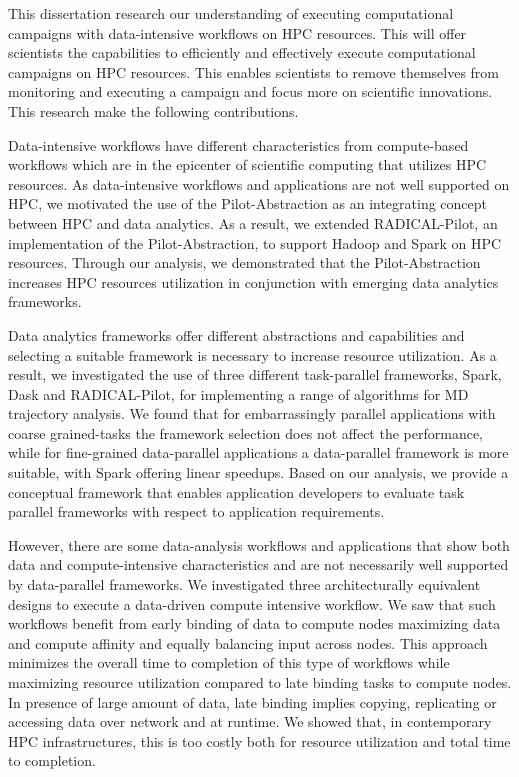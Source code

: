 \label{ch:conclusions}
This dissertation research our understanding of executing computational campaigns with data-intensive workflows on HPC resources.
This will offer scientists the capabilities to efficiently and effectively execute computational campaigns on HPC resources.
This enables scientists to remove themselves from monitoring and executing a campaign and focus more on scientific innovations.
This research make the following contributions.

Data-intensive workflows have different characteristics from compute-based workflows which are in the epicenter of scientific computing that utilizes HPC resources.
As data-intensive workflows and applications are not well supported on HPC, we motivated the use of the Pilot-Abstraction as an integrating concept between HPC and data analytics.
As a result, we extended RADICAL-Pilot, an implementation of the Pilot-Abstraction, to support Hadoop and Spark on HPC resources.
Through our analysis, we demonstrated that the Pilot-Abstraction increases HPC resources utilization in conjunction with emerging data analytics frameworks.

Data analytics frameworks offer different abstractions and capabilities and selecting a suitable framework is necessary to increase resource utilization.
As a result, we investigated the use of three different task-parallel frameworks, Spark, Dask and RADICAL-Pilot, for implementing a range of algorithms for MD trajectory analysis. 
We found that for embarrassingly parallel applications with coarse grained-tasks the framework selection does not affect the performance, while for fine-grained data-parallel applications a data-parallel framework is more suitable, with Spark offering linear speedups.
Based on our analysis, we provide a conceptual framework that enables application developers to evaluate task parallel frameworks with respect to application requirements.

However, there are some data-analysis workflows and applications that show both data and compute-intensive characteristics and are not necessarily well supported by data-parallel frameworks.
We investigated three architecturally equivalent designs to execute a data-driven compute intensive workflow.
We saw that such workflows benefit from early binding of data to compute nodes maximizing data and compute affinity and equally balancing input across nodes.
This approach minimizes the overall time to completion of this type of workflows while maximizing resource utilization compared to late binding tasks to compute nodes.
In presence of large amount of data, late binding implies copying, replicating or accessing data over network and at runtime.
We showed that, in contemporary HPC infrastructures, this is too costly both for resource utilization and total time to completion.

